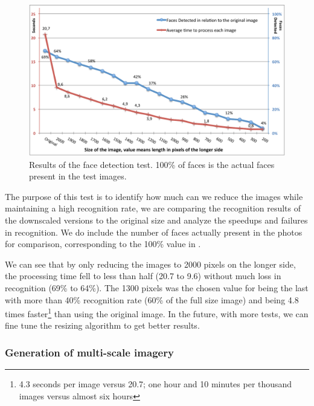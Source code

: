 \begin{figure}[ht]
	\centering
		\includegraphics[width=\columnwidth]{Figures/graph2.pdf}
	\caption{Results of the face detection test. 100\% of faces is the actual faces present in the test images.}
	\label{fig:fdres}
\end{figure}

The purpose of this test is to identify how much can we reduce the images while maintaining a high recognition rate, we are comparing the recognition results of the downscaled versions to the original size and analyze the speedups and failures in recognition. We do include the number of faces actually present in the photos for comparison, corresponding to the 100\% value in .

We can see that by only reducing the images to 2000 pixels on the longer side, the processing time fell to less than half (20.7 to 9.6) without much loss in recognition (69\% to 64\%). The 1300 pixels was the chosen value for being the last with more than 40\% recognition rate (60\% of the full size image) and being 4.8 times faster\footnote{4.3 seconds per image versus 20.7; one hour and 10 minutes per thousand images versus almost six hours} than using the original image. In the future, with more tests, we can fine tune the resizing algorithm to get better results.





\subsubsection{Generation of multi-scale imagery}

